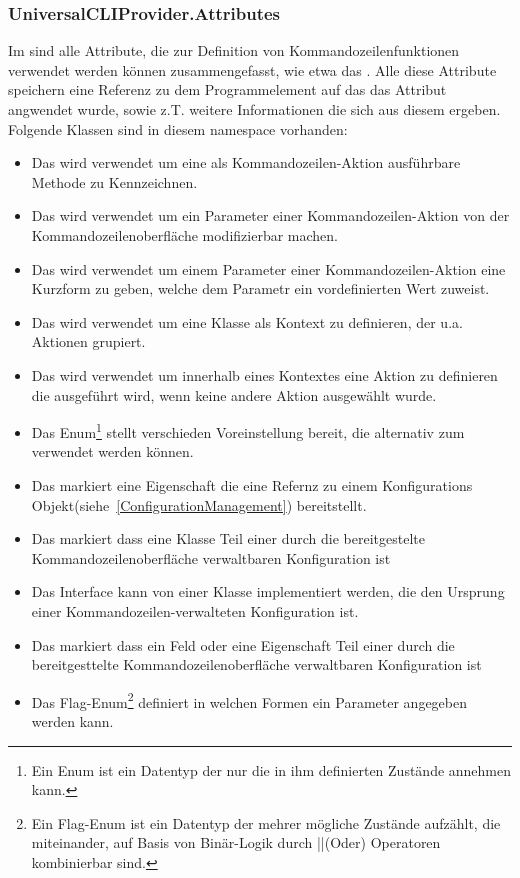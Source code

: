 \subsubsection{UniversalCLIProvider.Attributes}
Im  sind alle Attribute, die zur Definition von Kommandozeilenfunktionen verwendet werden können zusammengefasst, wie etwa das .
Alle diese Attribute speichern eine Referenz zu dem Programmelement auf das das Attribut angwendet wurde, sowie z.T. weitere Informationen die sich aus diesem ergeben.
Folgende Klassen sind in diesem namespace vorhanden:
\begin{itemize}
 \item Das  wird verwendet um eine als Kommandozeilen-Aktion ausführbare Methode zu Kennzeichnen.
 \item Das  wird verwendet um ein Parameter einer Kommandozeilen-Aktion von der Kommandozeilenoberfläche modifizierbar machen.
 \item Das  wird verwendet um einem Parameter einer Kommandozeilen-Aktion eine Kurzform zu geben, welche dem Parametr ein vordefinierten Wert zuweist.
 \item Das  wird verwendet um eine Klasse als Kontext zu definieren, der u.a. Aktionen grupiert.
 \item Das  wird verwendet um innerhalb eines Kontextes eine Aktion zu definieren die ausgeführt wird, wenn keine andere Aktion ausgewählt wurde.
 \item Das Enum\footnote{Ein Enum ist ein Datentyp der nur die in ihm definierten Zustände annehmen kann.} 
 stellt verschieden Voreinstellung bereit, die alternativ zum  verwendet werden können.
 \item Das  markiert eine Eigenschaft die eine Refernz zu einem Konfigurations Objekt(siehe~\ref{ConfigurationManagement}) bereitstellt.
 \item Das  markiert dass eine Klasse Teil einer durch die bereitgestelte Kommandozeilenoberfläche verwaltbaren Konfiguration ist
 \item Das Interface  kann von einer Klasse implementiert werden, die den Ursprung einer Kommandozeilen-verwalteten Konfiguration ist.
 \item Das markiert dass ein Feld oder eine Eigenschaft Teil einer durch die bereitgesttelte Kommandozeilenoberfläche verwaltbaren Konfiguration ist
 \item Das Flag-Enum\footnote{Ein Flag-Enum ist ein Datentyp der mehrer mögliche Zustände aufzählt, die miteinander, auf Basis von Binär-Logik durch ||(Oder) Operatoren kombinierbar sind.}
  definiert in welchen Formen ein Parameter angegeben werden kann.
\end{itemize}
